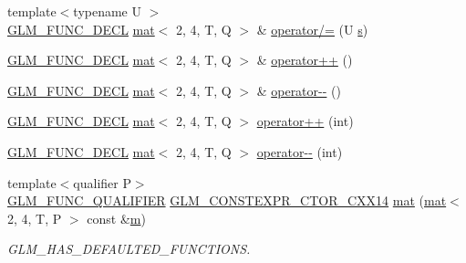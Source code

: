 \begin{DoxyCompactItemize}
\item 
{\footnotesize template$<$typename U $>$ }\\\mbox{\hyperlink{setup_8hpp_ab2d052de21a70539923e9bcbf6e83a51}{G\+L\+M\+\_\+\+F\+U\+N\+C\+\_\+\+D\+E\+CL}} \mbox{\hyperlink{structglm_1_1mat}{mat}}$<$ 2, 4, T, Q $>$ \& \mbox{\hyperlink{structglm_1_1mat_3_012_00_014_00_01_t_00_01_q_01_4_afaeb76359d6d5cc1917600e052c4c865}{operator/=}} (U \mbox{\hyperlink{_s_d_l__opengl_8h_a4af680a6c683f88ed67b76f207f2e6e4}{s}})
\item 
\mbox{\hyperlink{setup_8hpp_ab2d052de21a70539923e9bcbf6e83a51}{G\+L\+M\+\_\+\+F\+U\+N\+C\+\_\+\+D\+E\+CL}} \mbox{\hyperlink{structglm_1_1mat}{mat}}$<$ 2, 4, T, Q $>$ \& \mbox{\hyperlink{structglm_1_1mat_3_012_00_014_00_01_t_00_01_q_01_4_ad7e4a06905e2d7bab5a417c3db224ce3}{operator++}} ()
\item 
\mbox{\hyperlink{setup_8hpp_ab2d052de21a70539923e9bcbf6e83a51}{G\+L\+M\+\_\+\+F\+U\+N\+C\+\_\+\+D\+E\+CL}} \mbox{\hyperlink{structglm_1_1mat}{mat}}$<$ 2, 4, T, Q $>$ \& \mbox{\hyperlink{structglm_1_1mat_3_012_00_014_00_01_t_00_01_q_01_4_ad5fe0c9f99081a7811a94e12c4353e5b}{operator-\/-\/}} ()
\item 
\mbox{\hyperlink{setup_8hpp_ab2d052de21a70539923e9bcbf6e83a51}{G\+L\+M\+\_\+\+F\+U\+N\+C\+\_\+\+D\+E\+CL}} \mbox{\hyperlink{structglm_1_1mat}{mat}}$<$ 2, 4, T, Q $>$ \mbox{\hyperlink{structglm_1_1mat_3_012_00_014_00_01_t_00_01_q_01_4_a1f4e7b363fde7f785ace4e12a9c41316}{operator++}} (int)
\item 
\mbox{\hyperlink{setup_8hpp_ab2d052de21a70539923e9bcbf6e83a51}{G\+L\+M\+\_\+\+F\+U\+N\+C\+\_\+\+D\+E\+CL}} \mbox{\hyperlink{structglm_1_1mat}{mat}}$<$ 2, 4, T, Q $>$ \mbox{\hyperlink{structglm_1_1mat_3_012_00_014_00_01_t_00_01_q_01_4_a740949114d5da039edaed9052968f54b}{operator-\/-\/}} (int)
\item 
{\footnotesize template$<$qualifier P$>$ }\\\mbox{\hyperlink{setup_8hpp_a33fdea6f91c5f834105f7415e2a64407}{G\+L\+M\+\_\+\+F\+U\+N\+C\+\_\+\+Q\+U\+A\+L\+I\+F\+I\+ER}} \mbox{\hyperlink{setup_8hpp_a0900f9145e68bf6061b6f5e7be3fa751}{G\+L\+M\+\_\+\+C\+O\+N\+S\+T\+E\+X\+P\+R\+\_\+\+C\+T\+O\+R\+\_\+\+C\+X\+X14}} \mbox{\hyperlink{structglm_1_1mat_3_012_00_014_00_01_t_00_01_q_01_4_a20ea2b3c9367a0ab927a96a1b37cf119}{mat}} (\mbox{\hyperlink{structglm_1_1mat}{mat}}$<$ 2, 4, T, P $>$ const \&\mbox{\hyperlink{_s_d_l__opengl__glext_8h_af593500c283bf1a787a6f947f503a5c2}{m}})
\begin{DoxyCompactList}\small\item\em G\+L\+M\+\_\+\+H\+A\+S\+\_\+\+D\+E\+F\+A\+U\+L\+T\+E\+D\+\_\+\+F\+U\+N\+C\+T\+I\+O\+NS. \end{DoxyCompactList}\item 

\end{DoxyCompactItemize}
